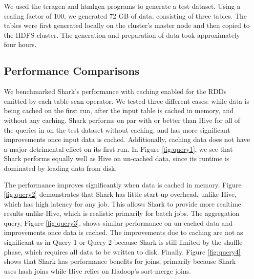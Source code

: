 

We used the teragen and htmlgen programs \cite{pavlo2009comparison} to generate a test dataset. Using a scaling factor of 100, we generated 72 GB of data, consisting of three tables. The tables were first generated locally on the cluster's master node and then copied to the HDFS cluster. The generation and preparation of data took approximately four hours.


\subsection{Performance Comparisons}

We benchmarked Shark's performance with caching enabled for the RDDs emitted by each table scan operator. We tested three different cases: while data is being cached on the first run, after the input table is cached in memory, and without any caching. Shark performs on par with or better than Hive for all of the queries in  \cite{pavlo2009comparison} on the test dataset without caching, and has more significant improvements once input data is cached. Additionally, caching data does not have a major detrimental effect on its first run. In Figure \ref{fig:query1}, we see that Shark performs equally well as Hive on un-cached data, since its runtime is dominated by loading data from disk. 

The performance improves significantly when data is cached in memory. Figure \ref{fig:query2} demonstrates that Shark has little start-up overhead, unlike Hive, which has high latency for any job. This allows Shark to provide more realtime results unlike Hive, which is realistic primarily for batch jobs. The aggregation query, Figure \ref{fig:query3}, shows similar performance on un-cached data and improvements once data is cached. The improvements due to caching are not as significant as in Query 1 or Query 2 because Shark is still limited by the shuffle phase, which requires all data to be written to disk. Finally, Figure \ref{fig:query4} shows that Shark has performance benefits for joins, primarily because Shark uses hash joins while Hive relies on Hadoop's sort-merge joins.


